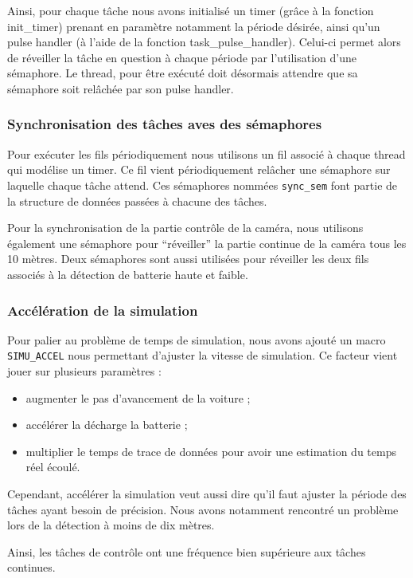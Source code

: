 \documentclass[conference]{IEEEtran}
\begin{document}
Ainsi, pour chaque tâche nous avons initialisé un timer (grâce à la fonction init\_timer)
prenant en paramètre notamment la période désirée, ainsi qu'un pulse handler (à l'aide de
la fonction task\_pulse\_handler). Celui-ci permet alors de réveiller la tâche en question
à chaque période par l'utilisation d'une sémaphore. Le thread, pour être exécuté doit
désormais attendre que sa sémaphore soit relâchée par son pulse handler.

\subsubsection{Synchronisation des tâches aves des sémaphores}

Pour exécuter les fils périodiquement nous utilisons un fil associé à chaque thread qui
modélise un timer. Ce fil vient périodiquement relâcher une sémaphore sur laquelle chaque
tâche attend. Ces sémaphores nommées \texttt{sync\_sem} font partie de la structure de
données passées à chacune des tâches.

Pour la synchronisation de la partie contrôle de la caméra, nous utilisons également une
sémaphore pour \enquote{réveiller} la partie continue de la caméra tous les 10 mètres.
Deux sémaphores sont aussi utilisées pour réveiller les deux fils associés à la détection
de batterie haute et faible.

\subsubsection{Accélération de la simulation}

Pour palier au problème de temps de simulation, nous avons ajouté un macro
\texttt{SIMU\_ACCEL} nous permettant d'ajuster la vitesse de simulation. Ce facteur vient
jouer sur plusieurs paramètres :
\begin{itemize}
	\item augmenter le pas d'avancement de la voiture ;
    \item accélérer la décharge la batterie ;
	\item multiplier le temps de trace de données pour avoir une estimation du temps réel
		écoulé.
\end{itemize}

Cependant, accélérer la simulation veut aussi dire qu'il faut ajuster la période des
tâches ayant besoin de précision. Nous avons notamment rencontré un problème lors de la
détection à moins de dix mètres.

Ainsi, les tâches de contrôle ont une fréquence bien supérieure aux tâches continues.
\end{document}
